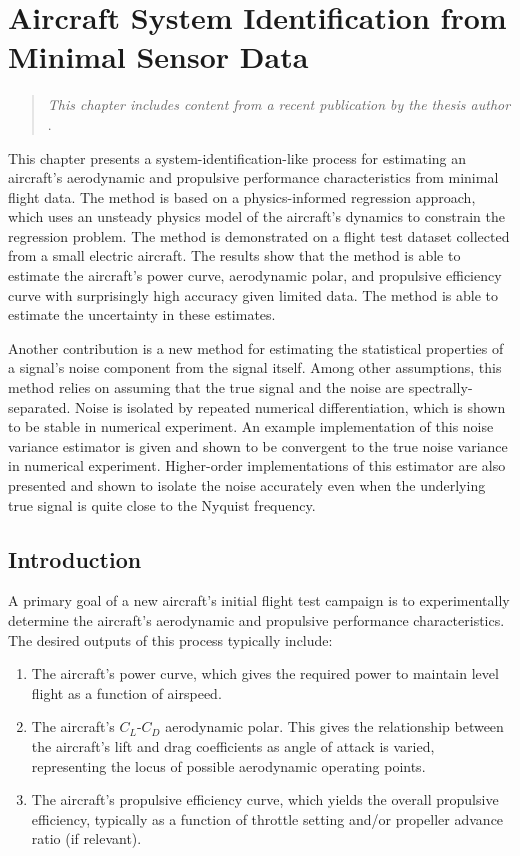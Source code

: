\chapter{Aircraft System Identification from Minimal Sensor Data}
\label{chap:aircraft_sysid}

\begin{quote}
    \emph{This chapter includes content from a recent publication by the thesis author} \cite{sharpe_physicsinformed_2024}.
\end{quote}

This chapter presents a system-identification-like process for estimating an aircraft's aerodynamic and propulsive performance characteristics from minimal flight data. The method is based on a physics-informed regression approach, which uses an unsteady physics model of the aircraft's dynamics to constrain the regression problem. The method is demonstrated on a flight test dataset collected from a small electric aircraft. The results show that the method is able to estimate the aircraft's power curve, aerodynamic polar, and propulsive efficiency curve with surprisingly high accuracy given limited data. The method is able to estimate the uncertainty in these estimates.

Another contribution is a new method for estimating the statistical properties of a signal's noise component from the signal itself. Among other assumptions, this method relies on assuming that the true signal and the noise are spectrally-separated. Noise is isolated by repeated numerical differentiation, which is shown to be stable in numerical experiment. An example implementation of this noise variance estimator is given and shown to be convergent to the true noise variance in numerical experiment. Higher-order implementations of this estimator are also presented and shown to isolate the noise accurately even when the underlying true signal is quite close to the Nyquist frequency.


\section{Introduction}

A primary goal of a new aircraft's initial flight test campaign is to experimentally determine the aircraft's aerodynamic and propulsive performance characteristics. The desired outputs of this process typically include:

\begin{enumerate}
    \item The aircraft's power curve, which gives the required power to maintain level flight as a function of airspeed.
    \item The aircraft's $C_L$-$C_D$ aerodynamic polar. This gives the relationship between the aircraft's lift and drag coefficients as angle of attack is varied, representing the locus of possible aerodynamic operating points.
    \item The aircraft's propulsive efficiency curve, which yields the overall propulsive efficiency, typically as a function of throttle setting and/or propeller advance ratio (if relevant).
\end{enumerate}

